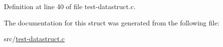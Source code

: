 Definition at line 40 of file test-\/datastruct.\-c.



The documentation for this struct was generated from the following file\-:\begin{DoxyCompactItemize}
\item 
src/\hyperlink{test-datastruct_8c}{test-\/datastruct.\-c}\end{DoxyCompactItemize}
